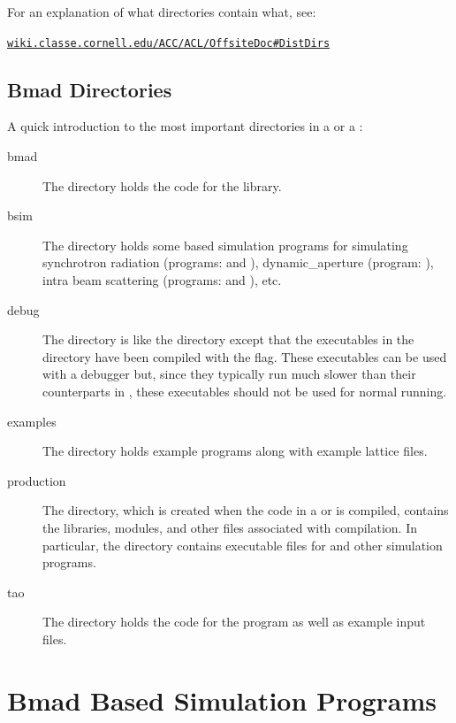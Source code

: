 \documentclass{hitec}
\newcommand{\Section}[1]{\section{#1}\vspace*{-1ex}}
\newenvironment{display}
  {\vspace*{-1.5ex} \begin{alltt}}
  {\end{alltt} \vspace*{-1.0ex}}
\begin{document}
For an explanation of what directories contain what, see:
\begin{display}
  \url{wiki.classe.cornell.edu/ACC/ACL/OffsiteDoc#DistDirs}
\end{display}

\newpage

\subsection{Bmad Directories}
\label{s:bmad.dir}

A quick introduction to the most important directories in a  or a :
  \begin{description}
  \item[bmad] \Newline
The  directory holds the code for the \bmad library.
  \item[bsim] \Newline
The  directory holds some \bmad based simulation programs for simulating
synchrotron radiation (programs:  and ), dynamic_aperture
(program: ), intra beam scattering (programs:  and
), etc.
  \item[debug] \Newline
The  directory is like the  directory except that the executables
in the  directory have been compiled with the  flag. These executables
can be used with a debugger but, since they typically run much slower than their counterparts in
, these executables should not be used for normal running.
  \item[examples] \Newline
The  directory holds example programs along with example lattice files.
  \item[production] \Newline
The  directory, which is created when the code in a  or
 is compiled, contains the libraries, modules, and other files associated with
compilation. In particular, the  directory contains executable files
for \tao and other simulation programs.

  \item[tao] \Newline
The  directory holds the code for the \tao program as well as example input
files.
  \end{description}

\newpage

\Section{Bmad Based Simulation Programs}
\label{s:programs}
\end{document}
